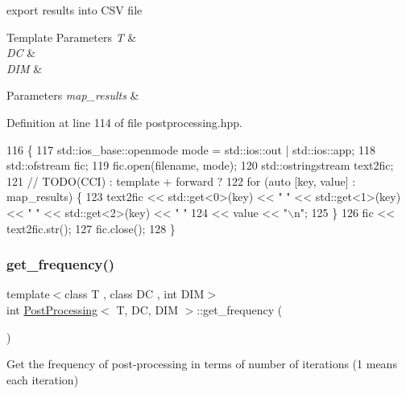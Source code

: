export results into C\+SV file 


\begin{DoxyTemplParams}{Template Parameters}
{\em T} & \\
\hline
{\em DC} & \\
\hline
{\em D\+IM} & \\
\hline
\end{DoxyTemplParams}

\begin{DoxyParams}{Parameters}
{\em map\+\_\+results} & \\
\hline
\end{DoxyParams}


Definition at line 114 of file postprocessing.\+hpp.


\begin{DoxyCode}
116                                                                       \{
117   std::ios\_base::openmode mode = std::ios::out | std::ios::app;
118   std::ofstream fic;
119   fic.open(filename, mode);
120   std::ostringstream text2fic;
121   \textcolor{comment}{// TODO(CCI) : template + forward ?}
122   \textcolor{keywordflow}{for} (\textcolor{keyword}{auto} [key, value] : map\_results) \{
123     text2fic << std::get<0>(key) << \textcolor{stringliteral}{" "} << std::get<1>(key) << \textcolor{stringliteral}{" "} << std::get<2>(key) << \textcolor{stringliteral}{" "}
124              << value << \textcolor{stringliteral}{"\(\backslash\)n"};
125   \}
126   fic << text2fic.str();
127   fic.close();
128 \}
\end{DoxyCode}
\mbox{\label{classPostProcessing_a910c85495a35f8e3303c17ece732fdcd}} 
\subsubsection{\texorpdfstring{get\+\_\+frequency()}{get\_frequency()}}
{\footnotesize\ttfamily template$<$class T , class DC , int D\+IM$>$ \\
int \hyperlink{classPostProcessing}{Post\+Processing}$<$ T, DC, D\+IM $>$\+::get\+\_\+frequency (\begin{DoxyParamCaption}{ }\end{DoxyParamCaption})}



Get the frequency of post-\/processing in terms of number of iterations (1 means each iteration) 

